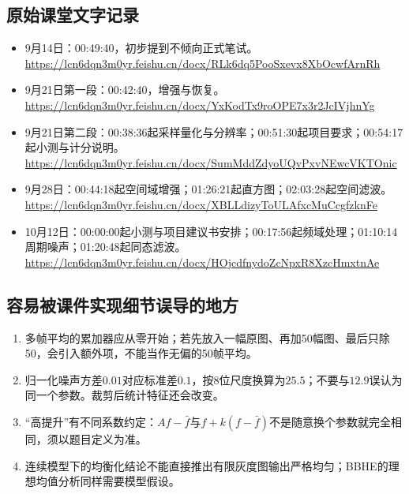 \subsection{原始课堂文字记录}
\begin{itemize}
\item 9月14日：00:49:40，初步提到不倾向正式笔试。\newline\url{https://lcn6dqn3m0yr.feishu.cn/docx/RLk6dq5PooSxevx8XbOcwfArnRh}
\item 9月21日第一段：00:42:40，增强与恢复。\newline\url{https://lcn6dqn3m0yr.feishu.cn/docx/YxKodTx9roOPE7x3r2JcIVjhnYg}
\item 9月21日第二段：00:38:36起采样量化与分辨率；00:51:30起项目要求；00:54:17起小测与计分说明。\newline\url{https://lcn6dqn3m0yr.feishu.cn/docx/SumMddZdyoUQvPxvNEwcVKTOnic}
\item 9月28日：00:44:18起空间域增强；01:26:21起直方图；02:03:28起空间滤波。\newline\url{https://lcn6dqn3m0yr.feishu.cn/docx/XBLLdizyToULAfxcMuCcgfzknFe}
\item 10月12日：00:00:00起小测与项目建议书安排；00:17:56起频域处理；01:10:14周期噪声；01:20:48起同态滤波。\newline\url{https://lcn6dqn3m0yr.feishu.cn/docx/HOjcdfnydoZcNpxR8XzcHmxtnAe}
\end{itemize}
\subsection{容易被课件实现细节误导的地方}
\begin{enumerate}
\item 多帧平均的累加器应从零开始；若先放入一幅原图、再加50幅图、最后只除50，会引入额外项，不能当作无偏的50帧平均。
\item 归一化噪声方差$0.01$对应标准差$0.1$，按8位尺度换算为$25.5$；不要与$12.9$误认为同一个参数。裁剪后统计特征还会改变。
\item “高提升”有不同系数约定：$Af-\bar f$与$f+k(f-\bar f)$不是随意换个参数就完全相同，须以题目定义为准。
\item 连续模型下的均衡化结论不能直接推出有限灰度图输出严格均匀；BBHE的理想均值分析同样需要模型假设。
\end{enumerate}
